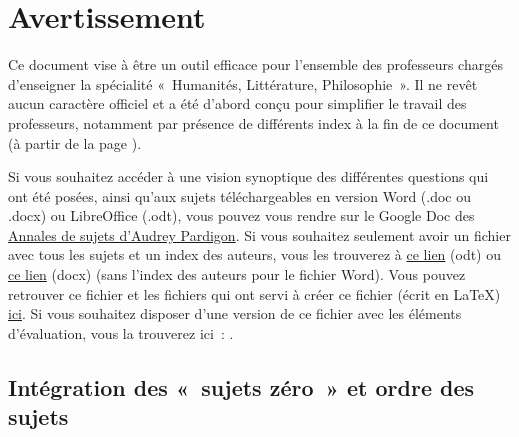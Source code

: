 \fancyhead{} %
\fancyhead[LE]{\rightmark}
\fancyfoot{} %
\fancyfoot[RO]{\textbf{\thepage} \hspace*{1.5cm}}
\fancyfoot[LE]{\hspace*{1.5cm}\textbf{\thepage}}
\renewcommand{\headrulewidth}{0.4pt}
\renewcommand{\footrulewidth}{0pt}

{\let\clearpage\relax%
\noindent\chapter{Avertissement}
}
\label{avertissement}

Ce document vise à être un outil efficace pour l'ensemble des professeurs chargés d'enseigner
la spécialité «~Humanités, Littérature, Philosophie~». Il ne revêt aucun caractère officiel
et a été d'abord conçu pour simplifier le travail des professeurs, notamment par présence de différents index à la fin de ce document (à partir de la page \pageref{indexdeb}).

Si vous souhaitez accéder à une vision synoptique des différentes questions qui ont été posées, ainsi qu'aux sujets téléchargeables en version Word (.doc ou .docx) ou LibreOffice (.odt), vous pouvez vous rendre sur le Google Doc des \href{https://docs.google.com/document/d/1594BtSBMpnk_i"Lpqf7vzIPnFkFG6ZFvygOAMzdtbPhA/edit?usp=sharing}{Annales de sujets d'Audrey Pardigon}. Si vous souhaitez seulement avoir un fichier avec tous les sujets et un index des auteurs, vous les trouverez à \href{https://drive.google.com/file/d/1DnEUzL6_MTiRfS60gFycgNy-jxfQFMsu/view?usp=sharing}{ce lien} (odt) ou \href{https://docs.google.com/document/d/1XnJ397bNF5Vn-ZwEVjEvbJiCvbMBvRGi/edit?usp=sharing&ouid=103662385121242831300&rtpof=true&sd=true}{ce lien} (docx) (sans l'index des auteurs pour le fichier Word). Vous pouvez retrouver ce fichier et les fichiers qui ont servi à créer ce fichier (écrit en \LaTeX{}) \href{https://drive.google.com/drive/folders/1QwtvLY3i87WzyajRLPe0Xmmb31FK9oDp?usp=sharing}{ici}. Si vous souhaitez disposer d'une version de ce fichier avec les éléments d'évaluation, vous la trouverez ici~: \sujetshlpcorr{}.

\section*{Intégration des «~sujets zéro~» et ordre des sujets}


